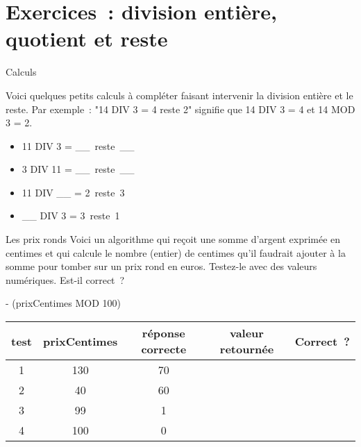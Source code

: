 \section{Exercices~: division entière, quotient et reste}

\begin{Exercice}{Calculs}

	Voici quelques petits calculs à compléter faisant intervenir la division entière
	et le reste.  Par exemple~: "14 DIV 3 = 4 reste 2" signifie que 14 DIV 3 = 4 et
	14 MOD 3 = 2.

	\begin{multicols}{2}
		\begin{itemize}
			\item 11 DIV 3 = \_\_\ reste\ \_\_
			\item 3 DIV 11 = \_\_\ reste\ \_\_
			\item 11 DIV \_\_ = 2\ reste\ 3
			\item \_\_ DIV 3 = 3\ reste\ 1
		\end{itemize}
	\end{multicols}
\end{Exercice}

\begin{Exercice}{Les prix ronds}
	Voici un algorithme qui reçoit une somme d’argent exprimée en centimes
	et qui calcule le nombre (entier) de centimes qu’il
	faudrait ajouter à la somme pour tomber sur un prix rond en euros.
	Testez-le avec des valeurs numériques. Est-il correct~?

	\begin{pseudocode}
		 - (prixCentimes MOD 100)
	\EndAlgo
\end{pseudocode}

\begin{center}
	\begin{tabular}{|c|c|c|c|c|}
		\hline
		test \no & prixCentimes & réponse correcte & valeur retournée & Correct~? \\\hline
		\hline 
		1 & 130 & 70 &  & \\\hline
		2 & 40  & 60 &  & \\\hline
		3 & 99  & 1  &  & \\\hline
		4 & 100 & 0  &  & \\\hline
	\end{tabular}
\end{center}

\end{Exercice}

